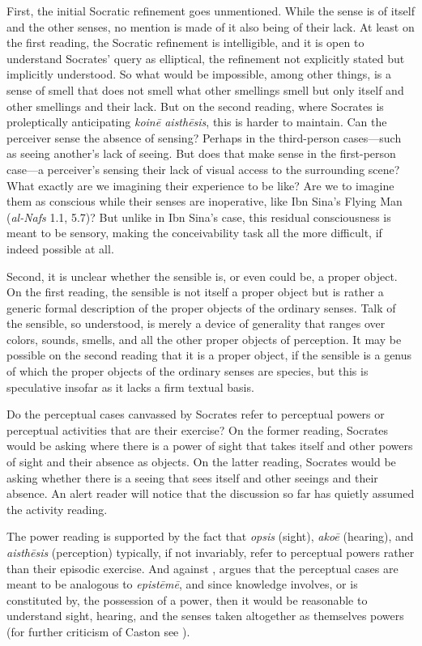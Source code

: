 First, the initial Socratic refinement goes unmentioned. While the sense is of itself and the other senses, no mention is made of it also being of their lack. At least on the first reading, the Socratic refinement is intelligible, and it is open to understand Socrates' query as elliptical, the refinement not explicitly stated but implicitly understood. So what would be impossible, among other things, is a sense of smell that does not smell what other smellings smell but only itself and other smellings and their lack. But on the second reading, where Socrates is proleptically anticipating \emph{koinē aisthēsis}, this is harder to maintain. Can the perceiver sense the absence of sensing? Perhaps in the third-person cases—such as seeing another's lack of seeing. But does that make sense in the first-person case—a perceiver's sensing their lack of visual access to the surrounding scene? What exactly are we imagining their experience to be like? Are we to imagine them as conscious while their senses are inoperative, like Ibn Sina's Flying Man (\emph{al-Nafs} 1.1, 5.7)? But unlike in Ibn Sina's case, this residual consciousness is meant to be sensory, making the conceivability task all the more difficult, if indeed possible at all.

Second, it is unclear whether the sensible is, or even could be, a proper object. On the first reading, the sensible is not itself a proper object but is rather a generic formal description of the proper objects of the ordinary senses. Talk of the sensible, so understood, is merely a device of generality that ranges over colors, sounds, smells, and all the other proper objects of perception. It may be possible on the second reading that it is a proper object, if the sensible is a genus of which the proper objects of the ordinary senses are species, but this is speculative insofar as it lacks a firm textual basis.

Do the perceptual cases canvassed by Socrates refer to perceptual powers or perceptual activities that are their exercise? On the former reading, Socrates would be asking where there is a power of sight that takes itself and other powers of sight and their absence as objects. On the latter reading, Socrates would be asking whether there is a seeing that sees itself and other seeings and their absence. An alert reader will notice that the discussion so far has quietly assumed the activity reading.

The power reading is supported by the fact that \emph{opsis} (sight), \emph{akoē} (hearing), and \emph{aisthēsis} (perception) typically, if not invariably, refer to perceptual powers rather than their episodic exercise. And against \citet[772–3]{caston02}, \citet[218 n18]{Tuozzo:2011aa} argues that the perceptual cases are meant to be analogous to \emph{epistēmē}, and since knowledge involves, or is constituted by, the possession of a power, then it would be reasonable to understand sight, hearing, and the senses taken altogether as themselves powers (for further criticism of Caston see \citealt{Johansen:2005hz}). 

